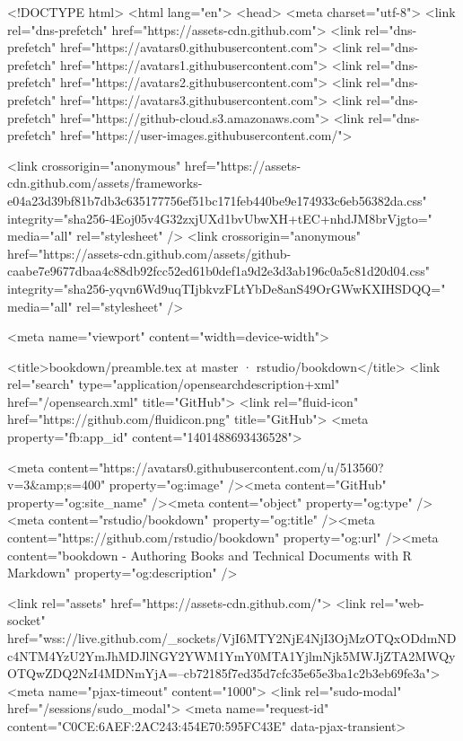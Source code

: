 





<!DOCTYPE html>
<html lang="en">
  <head>
    <meta charset="utf-8">
  <link rel="dns-prefetch" href="https://assets-cdn.github.com">
  <link rel="dns-prefetch" href="https://avatars0.githubusercontent.com">
  <link rel="dns-prefetch" href="https://avatars1.githubusercontent.com">
  <link rel="dns-prefetch" href="https://avatars2.githubusercontent.com">
  <link rel="dns-prefetch" href="https://avatars3.githubusercontent.com">
  <link rel="dns-prefetch" href="https://github-cloud.s3.amazonaws.com">
  <link rel="dns-prefetch" href="https://user-images.githubusercontent.com/">



  <link crossorigin="anonymous" href="https://assets-cdn.github.com/assets/frameworks-e04a23d39bf81b7db3c635177756ef51bc171feb440be9e174933c6eb56382da.css" integrity="sha256-4Eoj05v4G32zxjUXd1bvUbwXH+tEC+nhdJM8brVjgto=" media="all" rel="stylesheet" />
  <link crossorigin="anonymous" href="https://assets-cdn.github.com/assets/github-caabe7e9677dbaa4c88db92fcc52ed61b0def1a9d2e3d3ab196c0a5c81d20d04.css" integrity="sha256-yqvn6Wd9uqTIjbkvzFLtYbDe8anS49OrGWwKXIHSDQQ=" media="all" rel="stylesheet" />
  
  
  
  

  <meta name="viewport" content="width=device-width">
  
  <title>bookdown/preamble.tex at master · rstudio/bookdown</title>
  <link rel="search" type="application/opensearchdescription+xml" href="/opensearch.xml" title="GitHub">
  <link rel="fluid-icon" href="https://github.com/fluidicon.png" title="GitHub">
  <meta property="fb:app_id" content="1401488693436528">

    
    <meta content="https://avatars0.githubusercontent.com/u/513560?v=3&amp;s=400" property="og:image" /><meta content="GitHub" property="og:site_name" /><meta content="object" property="og:type" /><meta content="rstudio/bookdown" property="og:title" /><meta content="https://github.com/rstudio/bookdown" property="og:url" /><meta content="bookdown - Authoring Books and Technical Documents with R Markdown" property="og:description" />

  <link rel="assets" href="https://assets-cdn.github.com/">
  <link rel="web-socket" href="wss://live.github.com/_sockets/VjI6MTY2NjE4NjI3OjMzOTQxODdmNDc4NTM4YzU2YmJhMDJlNGY2YWM1YmY0MTA1YjlmNjk5MWJjZTA2MWQyOTQwZDQ2NzI4MDNmYjA=--cb72185f7ed35d7cfc35e65e3ba1c2b3eb69fe3a">
  <meta name="pjax-timeout" content="1000">
  <link rel="sudo-modal" href="/sessions/sudo_modal">
  <meta name="request-id" content="C0CE:6AEF:2AC243:454E70:595FC43E" data-pjax-transient>
  


